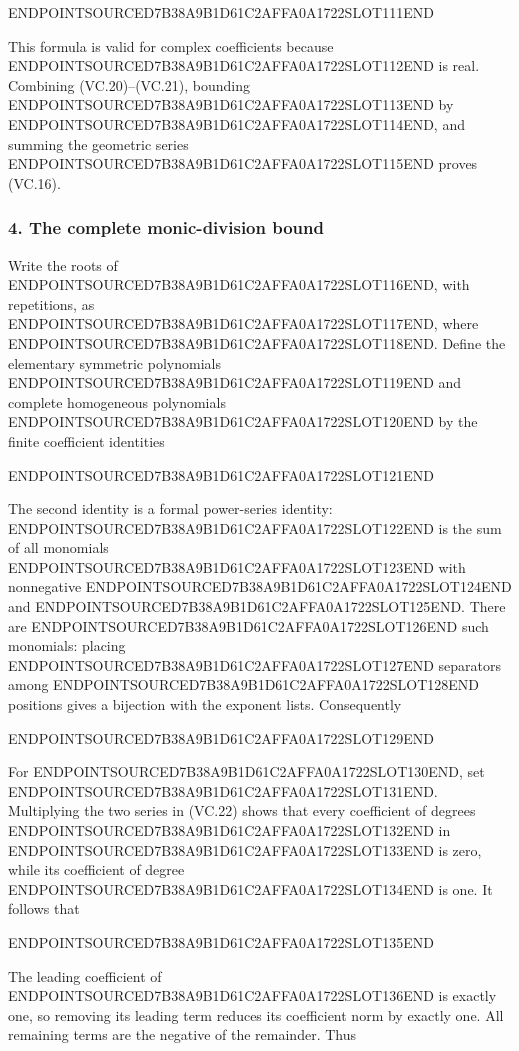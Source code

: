 ENDPOINTSOURCED7B38A9B1D61C2AFFA0A1722SLOT111END

This formula is valid for complex coefficients because ENDPOINTSOURCED7B38A9B1D61C2AFFA0A1722SLOT112END is real. Combining (VC.20)--(VC.21), bounding ENDPOINTSOURCED7B38A9B1D61C2AFFA0A1722SLOT113END by ENDPOINTSOURCED7B38A9B1D61C2AFFA0A1722SLOT114END, and summing the geometric series ENDPOINTSOURCED7B38A9B1D61C2AFFA0A1722SLOT115END proves (VC.16).

\subsubsection{4. The complete monic-division bound}\label{endpoint-volume_connection_original--the-complete-monic-division-bound}

Write the roots of ENDPOINTSOURCED7B38A9B1D61C2AFFA0A1722SLOT116END, with repetitions, as ENDPOINTSOURCED7B38A9B1D61C2AFFA0A1722SLOT117END, where ENDPOINTSOURCED7B38A9B1D61C2AFFA0A1722SLOT118END. Define the elementary symmetric polynomials ENDPOINTSOURCED7B38A9B1D61C2AFFA0A1722SLOT119END and complete homogeneous polynomials ENDPOINTSOURCED7B38A9B1D61C2AFFA0A1722SLOT120END by the finite coefficient identities

ENDPOINTSOURCED7B38A9B1D61C2AFFA0A1722SLOT121END

The second identity is a formal power-series identity: ENDPOINTSOURCED7B38A9B1D61C2AFFA0A1722SLOT122END is the sum of all monomials ENDPOINTSOURCED7B38A9B1D61C2AFFA0A1722SLOT123END with nonnegative ENDPOINTSOURCED7B38A9B1D61C2AFFA0A1722SLOT124END and ENDPOINTSOURCED7B38A9B1D61C2AFFA0A1722SLOT125END. There are ENDPOINTSOURCED7B38A9B1D61C2AFFA0A1722SLOT126END such monomials: placing ENDPOINTSOURCED7B38A9B1D61C2AFFA0A1722SLOT127END separators among ENDPOINTSOURCED7B38A9B1D61C2AFFA0A1722SLOT128END positions gives a bijection with the exponent lists. Consequently

ENDPOINTSOURCED7B38A9B1D61C2AFFA0A1722SLOT129END

For ENDPOINTSOURCED7B38A9B1D61C2AFFA0A1722SLOT130END, set ENDPOINTSOURCED7B38A9B1D61C2AFFA0A1722SLOT131END. Multiplying the two series in (VC.22) shows that every coefficient of degrees ENDPOINTSOURCED7B38A9B1D61C2AFFA0A1722SLOT132END in ENDPOINTSOURCED7B38A9B1D61C2AFFA0A1722SLOT133END is zero, while its coefficient of degree ENDPOINTSOURCED7B38A9B1D61C2AFFA0A1722SLOT134END is one. It follows that

ENDPOINTSOURCED7B38A9B1D61C2AFFA0A1722SLOT135END

The leading coefficient of ENDPOINTSOURCED7B38A9B1D61C2AFFA0A1722SLOT136END is exactly one, so removing its leading term reduces its coefficient norm by exactly one. All remaining terms are the negative of the remainder. Thus

